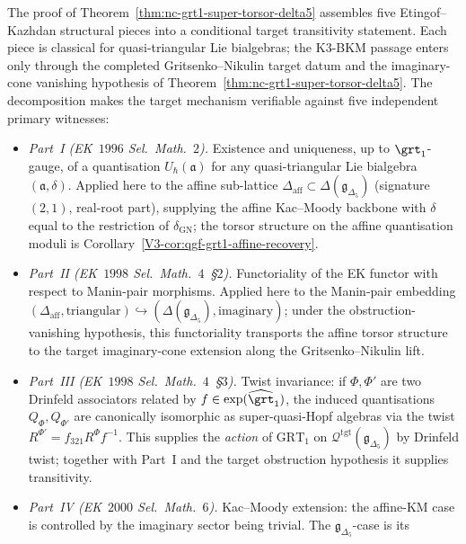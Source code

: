 \begin{remark}
\label{rem:nc-grt1-ek-parts-assembly}
The proof of Theorem~\ref{thm:nc-grt1-super-torsor-delta5} assembles
five Etingof--Kazhdan structural pieces into a conditional target
transitivity statement. Each piece is classical for quasi-triangular
Lie bialgebras; the K$3$-BKM passage enters only through the completed
Gritsenko--Nikulin target datum and the imaginary-cone vanishing
hypothesis of Theorem~\ref{thm:nc-grt1-super-torsor-delta5}. The
decomposition makes the target mechanism verifiable against five
independent primary witnesses:
\begin{itemize}
\item \emph{Part~I (EK~$1996$ Sel.~Math.~$2$).} Existence and
 uniqueness, up to $\grt_1$-gauge, of a quantisation
 $U_\hbar(\mathfrak a)$ for any quasi-triangular Lie bialgebra
 $(\mathfrak a, \delta)$. Applied here to the affine sub-lattice
 $\Delta_{\mathrm{aff}} \subset \Delta(\mathfrak g_{\Delta_5})$
 (signature $(2, 1)$, real-root part), supplying the affine
 Kac--Moody backbone with $\delta$ equal to the restriction of
 $\delta_{\mathrm{GN}}$; the torsor structure on the affine
 quantisation moduli is Corollary~\ref{V3-cor:qgf-grt1-affine-recovery}.
\item \emph{Part~II (EK~$1998$ Sel.~Math.~$4$~\S$2$).} Functoriality
 of the EK functor with respect to Manin-pair morphisms. Applied here
 to the Manin-pair embedding
 $(\Delta_{\mathrm{aff}}, \mathrm{triangular})
 \hookrightarrow (\Delta(\mathfrak g_{\Delta_5}), \mathrm{imaginary})$;
 under the obstruction-vanishing hypothesis, this functoriality
 transports the affine torsor structure to the target imaginary-cone
 extension along the Gritsenko--Nikulin lift.
\item \emph{Part~III (EK~$1998$ Sel.~Math.~$4$~\S$3$).} Twist
 invariance: if $\Phi, \Phi'$ are two Drinfeld associators related
 by $f \in \exp(\widehat\grt_1)$, the induced quantisations
 $Q_\Phi, Q_{\Phi'}$ are canonically isomorphic as super-quasi-Hopf
 algebras via the twist $R^{\Phi'} = f_{321} R^\Phi f^{-1}$. This
 supplies the \emph{action} of $\mathrm{GRT}_1$ on
 $\mathcal Q^{\mathrm{tgt}}(\mathfrak g_{\Delta_5})$ by Drinfeld
 twist; together with Part~I and the target obstruction hypothesis it
 supplies transitivity.
\item \emph{Part~IV (EK~$2000$ Sel.~Math.~$6$).} Kac--Moody
 extension: the affine-KM case is controlled by the imaginary
 sector being trivial. The $\mathfrak g_{\Delta_5}$-case is its

\end{itemize}
\end{remark}
